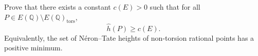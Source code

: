 \begin{openproblem}
Prove that there exists a constant $c(E)>0$ such that for all
$P \in E(\mathbb{Q}) \setminus E(\mathbb{Q})_{\mathrm{tors}}$,
\[
\hat h(P) \ge c(E).
\]
Equivalently, the set of Néron--Tate heights of non-torsion rational points
has a positive minimum.
\end{openproblem}

